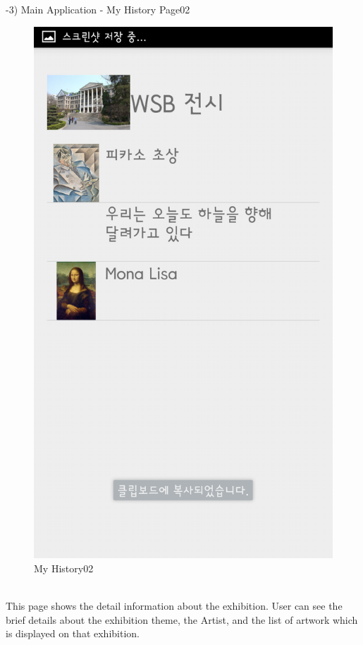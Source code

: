 \documentclass[conference]{IEEEtran}
\begin{document}
-3) Main Application - My History Page02\\
\begin{figure}[htbp]
\begin{center}
    \includegraphics[scale=0.2]{img_capture05}
    \caption{My History02} 
\end{center}
\end{figure}\\
\quad This page shows the detail information about the exhibition. User can see the brief details about the exhibition theme, the Artist, and the list of artwork which is displayed on that exhibition. \\\\
\end{document}
